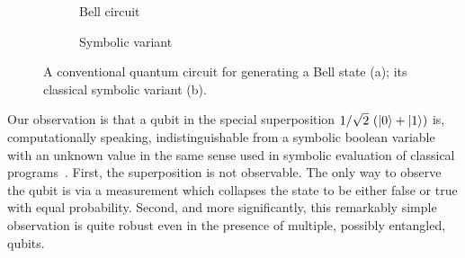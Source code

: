 \documentclass[sigplan,screen]{acmart}
\theoremstyle{definition}
\begin{document}
\begin{figure}[t]
  \centering
\begin{subfigure}[b]{.25\textwidth}
    \centering
\caption{\label{fig:bellqcore}Bell circuit}
\end{subfigure}
\qquad\qquad
\begin{subfigure}[b]{.25\textwidth}
    \centering
\caption{\label{fig:bellccore}Symbolic variant}
\end{subfigure}
\caption{\label{fig:bellall}A conventional quantum circuit for
  generating a Bell state (a); its classical symbolic variant (b).}
\end{figure}

Our observation is that a qubit in the special superposition
$1/\sqrt{2} ~(\ket{0} + \ket{1} )$ is, computationally speaking,
indistinguishable from a symbolic boolean variable with an unknown
value in the same sense used in symbolic evaluation of classical
programs~\cite{10.1145/390016.808445,10.1145/360248.360252,howden,10.1145/800191.805647,10.1145/3182657}.
First, the superposition is not observable. The only way to
observe the qubit is via a measurement which collapses the state to be
either false or true with equal probability. Second, and more
significantly, this remarkably simple observation is quite robust even
in the presence of multiple, possibly entangled, qubits.
\end{document}
